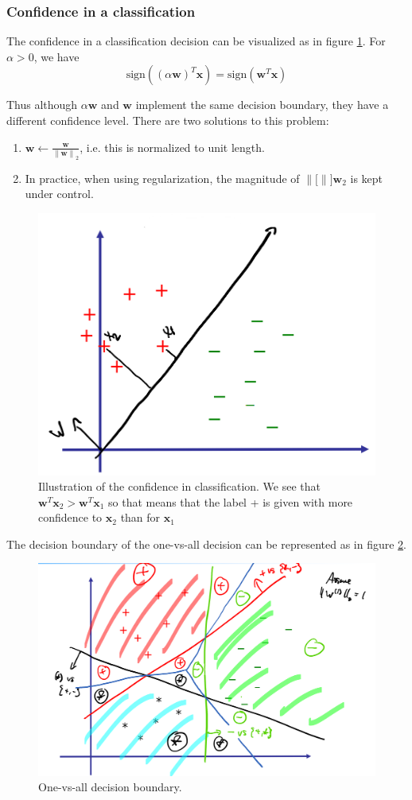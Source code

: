 \documentclass[a4paper,10pt,twoside]{article}
\newcommand\norm[1]{\left\lVert#1\right\rVert}
\begin{document}
\subsubsection{Confidence in a classification}

The confidence in a classification decision can be visualized as in figure \ref{confidence-in-classification}. For $\alpha>0$, we have
\begin{equation*}
    \text{sign}((\alpha\mathbf{w})^T\mathbf{x})=\text{sign}(\mathbf{w}^T\mathbf{x})
\end{equation*}

Thus although $\alpha\mathbf{w}$ and $\mathbf{w}$ implement the same decision boundary, they have a different confidence level. There are two solutions to this problem:
\begin{enumerate}
    \item $\mathbf{w}\leftarrow \frac{\mathbf{w}}{\norm{\mathbf{w}}_2}$, i.e. this is normalized to unit length.
    \item In practice, when using regularization, the magnitude of $\norm[]{\mathbf{w}}_2$ is kept under control.
\end{enumerate}

\begin{figure}
    \centering
    \includegraphics[width=.5\textwidth]{figures/confidence-in-classification.png}
    \caption{Illustration of the confidence in classification. We see that $\mathbf{w}^T\mathbf{x}_2>\mathbf{w}^T\mathbf{x}_1$ so that means that the label + is given with more confidence to $\mathbf{x}_2$ than for $\mathbf{x}_1$}
    \label{confidence-in-classification}
\end{figure}

The decision boundary of the one-vs-all decision can be represented as in figure \ref{ova-decision-boundary}.

\begin{figure}
    \centering
    \includegraphics[width=.5\textwidth]{figures/ova-decision-boundary.png}
    \caption{One-vs-all decision boundary.}
    \label{ova-decision-boundary}
\end{figure}
\end{document}
